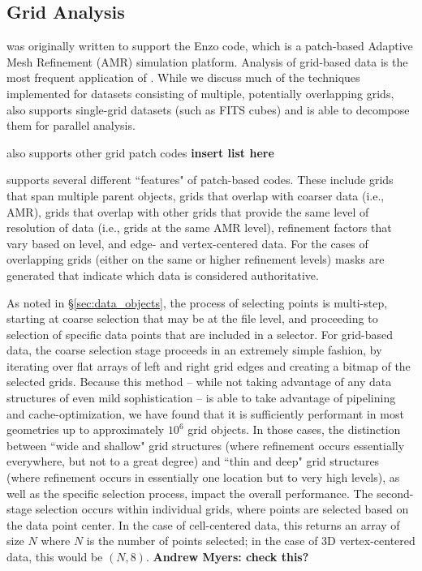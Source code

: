 \subsection{Grid Analysis}

\yt{} was originally written to support the Enzo code, which is a patch-based
Adaptive Mesh Refinement (AMR) simulation platform.  Analysis of grid-based
data is the most frequent application of \yt{}.  While we discuss much of the
techniques implemented for datasets consisting of multiple, potentially
overlapping grids, \yt{} also supports single-grid datasets (such as FITS
cubes) and is able to decompose them for parallel analysis.

\yt{} also supports other grid patch codes \textbf{insert list here}

\yt{} supports several different ``features" of patch-based codes.  These
include grids that span multiple parent objects, grids that overlap with
coarser data (i.e., AMR), grids that overlap with other grids that provide the
same level of resolution of data (i.e., grids at the same AMR level),
refinement factors that vary based on level, and edge- and vertex-centered
data.  For the cases of overlapping grids (either on the same or higher
refinement levels) masks are generated that indicate which data is considered
authoritative.

As noted in \S \ref{sec:data_objects}, the process of selecting points is
multi-step, starting at coarse selection that may be at the file level, and
proceeding to selection of specific data points that are included in a
selector.  For grid-based data, the coarse selection stage proceeds in an
extremely simple fashion, by iterating over flat arrays of left and right grid
edges and creating a bitmap of the selected grids.  Because this method --
while not taking advantage of any data structures of even mild sophistication
-- is able to take advantage of pipelining and cache-optimization, we have
found that it is sufficiently performant in most geometries up to approximately
$10^6$ grid objects.  In those cases, the distinction between ``wide and
shallow" grid structures (where refinement occurs essentially everywhere, but
not to a great degree) and ``thin and deep" grid structures (where refinement
occurs in essentially one location but to very high levels), as well as the
specific selection process, impact the overall performance.  The second-stage
selection occurs within individual grids, where points are selected based on
the data point center.  In the case of cell-centered data, this returns an
array of size $N$ where $N$ is the number of points selected; in the case of
3D vertex-centered data, this would be $(N,8)$. \textbf{Andrew Myers: check
this?}

